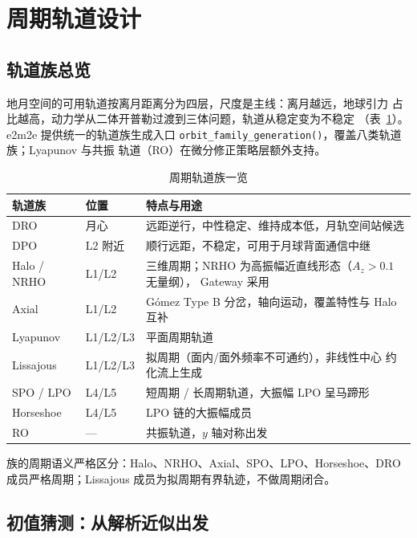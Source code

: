 \section{周期轨道设计}
\label{sec:orbit}

\subsection{轨道族总览}

地月空间的可用轨道按离月距离分为四层，尺度是主线：离月越远，地球引力
占比越高，动力学从二体开普勒过渡到三体问题，轨道从稳定变为不稳定
（表~\ref{tab:families}）。e2m2e 提供统一的轨道族生成入口
\texttt{orbit\_family\_generation()}，覆盖八类轨道族；Lyapunov 与共振
轨道（RO）在微分修正策略层额外支持。

\begin{table}[htbp]
\centering\small
\caption{周期轨道族一览}
\label{tab:families}
\begin{tabularx}{\textwidth}{@{}llX@{}}
\toprule
\textbf{轨道族} & \textbf{位置} & \textbf{特点与用途} \\
\midrule
DRO & 月心 & 远距逆行，中性稳定、维持成本低，月轨空间站候选 \\
DPO & L2 附近 & 顺行远距，不稳定，可用于月球背面通信中继 \\
Halo / NRHO & L1/L2 & 三维周期；NRHO 为高振幅近直线形态（$A_z > 0.1$ 无量纲），
Gateway 采用 \\
Axial & L1/L2 & Gómez Type B 分岔，轴向运动，覆盖特性与 Halo 互补 \\
Lyapunov & L1/L2/L3 & 平面周期轨道 \\
Lissajous & L1/L2/L3 & 拟周期（面内/面外频率不可通约），非线性中心
约化流上生成 \\
SPO / LPO & L4/L5 & 短周期 / 长周期轨道，大振幅 LPO 呈马蹄形 \\
Horseshoe & L4/L5 & LPO 链的大振幅成员 \\
RO & --- & 共振轨道，$y$ 轴对称出发 \\
\bottomrule
\end{tabularx}
\end{table}

族的周期语义严格区分：Halo、NRHO、Axial、SPO、LPO、Horseshoe、DRO
成员严格周期；Lissajous 成员为拟周期有界轨迹，不做周期闭合。

\subsection{初值猜测：从解析近似出发}

